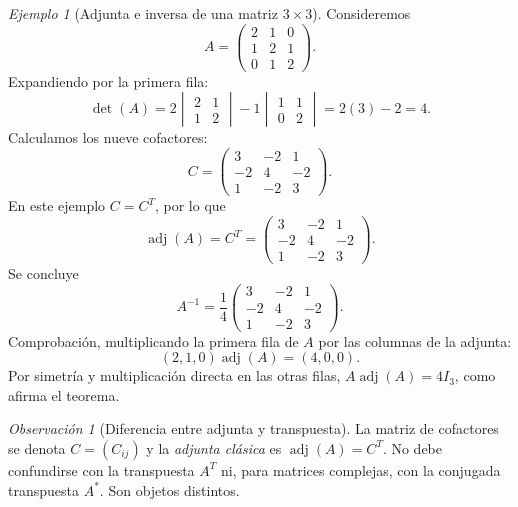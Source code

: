 \documentclass[12pt]{article}
\theoremstyle{remark}
\newtheorem{observacion}[definicion]{Observación}
\newtheorem{ejemplo}[definicion]{Ejemplo}
\newcommand{\adj}{\operatorname{adj}}
\begin{document}
\begin{ejemplo}[Adjunta e inversa de una matriz $3\times3$]
Consideremos
\[
A=\begin{pmatrix}2&1&0\\1&2&1\\0&1&2\end{pmatrix}.
\]
Expandiendo por la primera fila:
\[
\det(A)=2\begin{vmatrix}2&1\\1&2\end{vmatrix}
-1\begin{vmatrix}1&1\\0&2\end{vmatrix}
=2(3)-2=4.
\]
Calculamos los nueve cofactores:
\[
C=\begin{pmatrix}
3&-2&1\\
-2&4&-2\\
1&-2&3
\end{pmatrix}.
\]
En este ejemplo $C=C^T$, por lo que
\[
\adj(A)=C^T=\begin{pmatrix}
3&-2&1\\-2&4&-2\\1&-2&3
\end{pmatrix}.
\]
Se concluye
\[
\boxed{A^{-1}=\frac14\begin{pmatrix}
3&-2&1\\-2&4&-2\\1&-2&3
\end{pmatrix}.}
\]
Comprobación, multiplicando la primera fila de $A$ por las columnas de la adjunta:
\[
(2,1,0)\adj(A)=(4,0,0).
\]
Por simetría y multiplicación directa en las otras filas, $A\adj(A)=4I_3$, como afirma el teorema.
\end{ejemplo}


\begin{observacion}[Diferencia entre adjunta y transpuesta]
La matriz de cofactores se denota $C=(C_{ij})$ y la \emph{adjunta clásica} es $\operatorname{adj}(A)=C^T$. No debe confundirse con la transpuesta $A^T$ ni, para matrices complejas, con la conjugada transpuesta $A^*$. Son objetos distintos.
\end{observacion}
\end{document}
